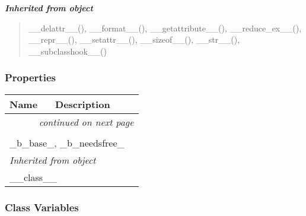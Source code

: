 \large{\textbf{\textit{Inherited from object}}}

\begin{quote}
\_\_delattr\_\_(), \_\_format\_\_(), \_\_getattribute\_\_(), \_\_reduce\_ex\_\_(), \_\_repr\_\_(), \_\_setattr\_\_(), \_\_sizeof\_\_(), \_\_str\_\_(), \_\_subclasshook\_\_()
\end{quote}


  \subsubsection{Properties}

    \vspace{-1cm}
\hspace{\varindent}\begin{longtable}{|p{\varnamewidth}|p{\vardescrwidth}|l}
\cline{1-2}
\cline{1-2} \centering \textbf{Name} & \centering \textbf{Description}& \\
\cline{1-2}
\endhead\cline{1-2}\multicolumn{3}{r}{\small\textit{continued on next page}}\\\endfoot\cline{1-2}
\endlastfoot\multicolumn{2}{|l|}{\textit{Inherited from ??.\_CData}}\\
\multicolumn{2}{|p{\varwidth}|}{\raggedright \_b\_base\_, \_b\_needsfree\_}\\
\cline{1-2}
\multicolumn{2}{|l|}{\textit{Inherited from object}}\\
\multicolumn{2}{|p{\varwidth}|}{\raggedright \_\_class\_\_}\\
\cline{1-2}
\end{longtable}



  \subsubsection{Class Variables}

